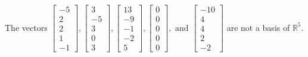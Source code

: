 \begin{exercise}
\begin{exerciseStatement}
  \end{exerciseStatement}
  \begin{exerciseAnswer}
   The vectors \(\left[\begin{array}{r}
-5 \\
2 \\
2 \\
1 \\
-1
\end{array}\right] , \left[\begin{array}{r}
3 \\
-5 \\
3 \\
0 \\
3
\end{array}\right] , \left[\begin{array}{r}
13 \\
-9 \\
-1 \\
-2 \\
5
\end{array}\right] , \left[\begin{array}{r}
0 \\
0 \\
0 \\
0 \\
0
\end{array}\right] , \text{ and } \left[\begin{array}{r}
-10 \\
4 \\
4 \\
2 \\
-2
\end{array}\right]\) 
  	 are not  a basis of \(\mathbb{R}^5\).
  


  \end{exerciseAnswer}
\end{exercise}